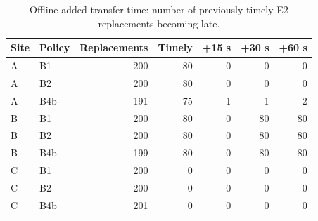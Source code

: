 \begin{table}[H]\centering\footnotesize
\caption{Offline added transfer time: number of previously timely E2 replacements becoming late.}\label{tab:transfer}
\begin{tabularx}{\textwidth}{@{}llrrrrr@{}}\toprule
Site & Policy & Replacements & Timely & +15 s & +30 s & +60 s \\\midrule
A & B1 & 200 & 80 & 0 & 0 & 0 \\
A & B2 & 200 & 80 & 0 & 0 & 0 \\
A & B4b & 191 & 75 & 1 & 1 & 2 \\
B & B1 & 200 & 80 & 0 & 80 & 80 \\
B & B2 & 200 & 80 & 0 & 80 & 80 \\
B & B4b & 199 & 80 & 0 & 80 & 80 \\
C & B1 & 200 & 0 & 0 & 0 & 0 \\
C & B2 & 200 & 0 & 0 & 0 & 0 \\
C & B4b & 201 & 0 & 0 & 0 & 0 \\
\bottomrule\end{tabularx}\end{table}